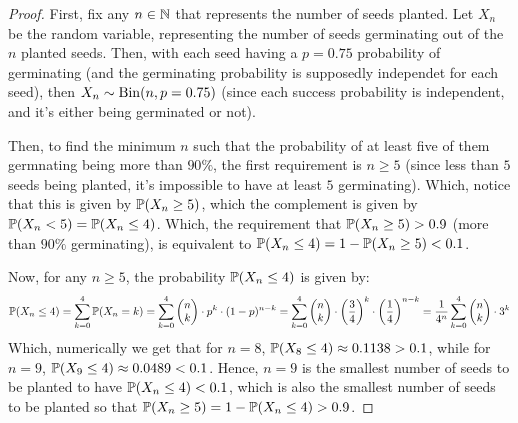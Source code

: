 \documentclass{article}
\begin{document}
\begin{proof}
    First, fix any $n\in\mathbb{N}$ that represents the number of seeds planted. Let $X_n$ be the random variable, representing the number of seeds germinating out of the $n$ planted seeds. Then, with each seed having a $p=0.75$ probability of germinating (and the germinating probability is supposedly independet for each seed), then $X_n \sim \mathrm{Bin}(n, p=0.75)$ (since each success probability is independent, and it's either being germinated or not).

    Then, to find the minimum $n$ such that the probability of at least five of them germnating being more than $90\%$, the first requirement is $n\geq 5$ (since less than $5$ seeds being planted, it's impossible to have at least $5$ germinating). Which, notice that this is given by $\mathbb{P}(X_n\geq 5)$, which the complement is given by $\mathbb{P}(X_n<5) = \mathbb{P}(X_n\leq 4)$. Which, the requirement that $\mathbb{P}(X_n\geq 5) > 0.9$ (more than $90\%$ germinating), is equivalent to $\mathbb{P}(X_n\leq 4) = 1-\mathbb{P}(X_n\geq 5) < 0.1$. 
    
    Now, for any $n\geq 5$, the probability $\mathbb{P}(X_n\leq 4)$ is given by:
    \begin{align}
        \mathbb{P}(X_n\leq 4) = \sum_{k=0}^{4}\mathbb{P}(X_n=k) = \sum_{k=0}^{4}\begin{pmatrix}n\\k\end{pmatrix} \cdot p^k \cdot(1-p)^{n-k} = \sum_{k=0}^{4}\begin{pmatrix}n\\k\end{pmatrix} \cdot \left(\frac{3}{4}\right)^k \cdot\left(\frac{1}{4}\right)^{n-k} = \frac{1}{4^n}\sum_{k=0}^{4}\begin{pmatrix}n\\k\end{pmatrix} \cdot 3^k
    \end{align}
    Which, numerically we get that for $n=8$, $\mathbb{P}(X_8\leq 4)\approx 0.1138 > 0.1$, while for $n=9$, $\mathbb{P}(X_9\leq 4) \approx 0.0489 < 0.1$. Hence, $n=9$ is the smallest number of seeds to be planted to have $\mathbb{P}(X_n\leq 4)<0.1$, which is also the smallest number of seeds to be planted so that $\mathbb{P}(X_n\geq 5) = 1-\mathbb{P}(X_n\leq 4)>0.9$.
\end{proof}

\hfil
\end{document}
